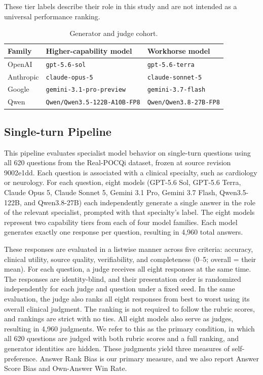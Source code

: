 \documentclass[11pt]{article}
\newcommand{\model}[1]{\texttt{#1}}
\begin{document}
These tier labels describe their role in this study and
are not intended as a universal performance ranking.

\begin{table}[htbp]
\centering
\caption{Generator and judge cohort.}
\label{tab:cohort}
\begin{tabular}{lll}
\toprule
Family & Higher-capability model & Workhorse model \\
\midrule
OpenAI & \model{gpt-5.6-sol} & \model{gpt-5.6-terra} \\
Anthropic & \model{claude-opus-5} & \model{claude-sonnet-5} \\
Google & \model{gemini-3.1-pro-preview} & \model{gemini-3.7-flash} \\
Qwen & \model{Qwen/Qwen3.5-122B-A10B-FP8} & \model{Qwen/Qwen3.8-27B-FP8} \\
\bottomrule
\end{tabular}
\end{table}
\FloatBarrier

\subsection{Single-turn Pipeline}

This pipeline evaluates specialist model behavior on single-turn questions using all 620 questions from the Real-POCQi dataset, frozen at source revision 9002e1dd. Each question is associated with a clinical specialty, such as cardiology or neurology. For each question, eight models (GPT-5.6 Sol, GPT-5.6 Terra, Claude Opus 5, Claude Sonnet 5, Gemini 3.1 Pro, Gemini 3.7 Flash, Qwen3.5-122B, and Qwen3.8-27B) each independently generate a single answer in the role of the relevant specialist, prompted with that specialty's label. The eight models represent two capability tiers from each of four model families. Each model generates exactly one response per question, resulting in 4,960 total answers.

These responses are evaluated in a listwise manner across five criteria: accuracy, clinical utility, source quality, verifiability, and completeness (0–5; overall = their mean). For each question, a judge receives all eight responses at the same time. The responses are identity-blind, and their presentation order is randomized independently for each judge and question under a fixed seed. In the same evaluation, the judge also ranks all eight responses from best to worst using its overall clinical judgment. The ranking is not required to follow the rubric scores, and rankings are strict with no ties. All eight models also serve as judges, resulting in 4,960 judgments. We refer to this as the primary condition, in which all 620 questions are judged with both rubric scores and a full ranking, and generator identities are hidden. These judgments yield three measures of self-preference. Answer Rank Bias is our primary measure, and we also report Answer Score Bias and Own-Answer Win Rate.
\end{document}
